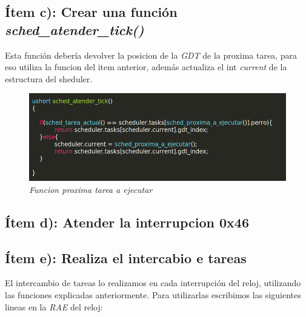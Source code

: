 \subsection{Ítem c):  Crear una función \textit{sched\_atender\_tick()}}

Esta función debería devolver la posicion de la \textit{GDT} de la proxima tarea, para eso utiliza la funcion del item anterior, además actualiza el int \textit{current} de la estructura del sheduler. 

\begin{figure}[H]
\begin{center}
\includegraphics[width=\linewidth]{ejercicio7/atendtick.png}
\caption{{\small \textit{Funcion proxima tarea a ejecutar }}}
\endminipage
\end{center}
\end{figure}

\subsection{Ítem d):  Atender la interrupcion 0x46}

\subsection{Ítem e):  Realiza el intercabio e tareas}

El intercambio de tareas lo realizamos en cada interrupción del reloj, utilizando las funciones explicadas anteriormente. Para utilizarlas escribimos las siguientes lineas en la \textit{RAE} del reloj:

